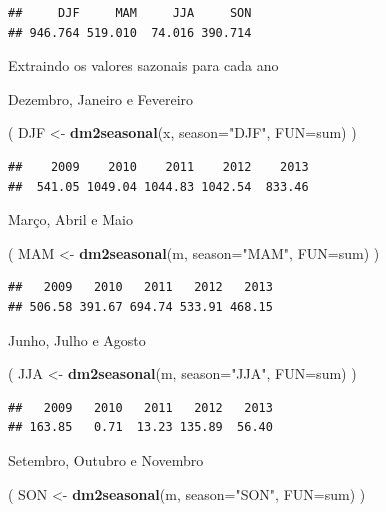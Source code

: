 \documentclass[
]{book}
\newenvironment{Shaded}{\begin{snugshade}}{\end{snugshade}}
\newcommand{\DataTypeTok}[1]{\textcolor[rgb]{0.13,0.29,0.53}{#1}}
\newcommand{\KeywordTok}[1]{\textcolor[rgb]{0.13,0.29,0.53}{\textbf{#1}}}
\newcommand{\NormalTok}[1]{#1}
\newcommand{\StringTok}[1]{\textcolor[rgb]{0.31,0.60,0.02}{#1}}
\begin{document}
\begin{verbatim}
##     DJF     MAM     JJA     SON 
## 946.764 519.010  74.016 390.714
\end{verbatim}

Extraindo os valores sazonais para cada ano

Dezembro, Janeiro e Fevereiro

\begin{Shaded}
\begin{Highlighting}[]
\NormalTok{( DJF <-}\StringTok{ }\KeywordTok{dm2seasonal}\NormalTok{(x, }\DataTypeTok{season=}\StringTok{"DJF"}\NormalTok{, }\DataTypeTok{FUN=}\NormalTok{sum) )}
\end{Highlighting}
\end{Shaded}

\begin{verbatim}
##    2009    2010    2011    2012    2013 
##  541.05 1049.04 1044.83 1042.54  833.46
\end{verbatim}

Março, Abril e Maio

\begin{Shaded}
\begin{Highlighting}[]
\NormalTok{( MAM <-}\StringTok{ }\KeywordTok{dm2seasonal}\NormalTok{(m, }\DataTypeTok{season=}\StringTok{"MAM"}\NormalTok{, }\DataTypeTok{FUN=}\NormalTok{sum) )}
\end{Highlighting}
\end{Shaded}

\begin{verbatim}
##   2009   2010   2011   2012   2013 
## 506.58 391.67 694.74 533.91 468.15
\end{verbatim}

Junho, Julho e Agosto

\begin{Shaded}
\begin{Highlighting}[]
\NormalTok{( JJA <-}\StringTok{ }\KeywordTok{dm2seasonal}\NormalTok{(m, }\DataTypeTok{season=}\StringTok{"JJA"}\NormalTok{, }\DataTypeTok{FUN=}\NormalTok{sum) )}
\end{Highlighting}
\end{Shaded}

\begin{verbatim}
##   2009   2010   2011   2012   2013 
## 163.85   0.71  13.23 135.89  56.40
\end{verbatim}

Setembro, Outubro e Novembro

\begin{Shaded}
\begin{Highlighting}[]
\NormalTok{( SON <-}\StringTok{ }\KeywordTok{dm2seasonal}\NormalTok{(m, }\DataTypeTok{season=}\StringTok{"SON"}\NormalTok{, }\DataTypeTok{FUN=}\NormalTok{sum) )}
\end{Highlighting}
\end{Shaded}
\end{document}

